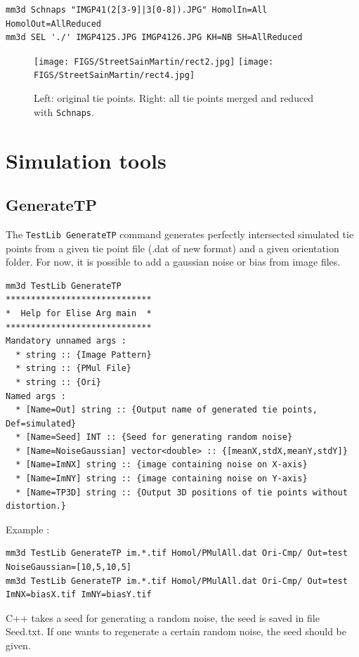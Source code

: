 \begin{verbatim}
mm3d Schnaps "IMGP41(2[3-9]|3[0-8]).JPG" HomolIn=All HomolOut=AllReduced
mm3d SEL './' IMGP4125.JPG IMGP4126.JPG KH=NB SH=AllReduced
\end{verbatim} 

\begin{figure}[!h]
	\begin{center}
		\texttt{[image: FIGS/StreetSainMartin/rect2.jpg]}
		\texttt{[image: FIGS/StreetSainMartin/rect4.jpg]}
		\caption{Left: original tie points. Right: all tie points merged and reduced with \texttt{Schnaps}.}
	\end{center}	
\end{figure}

\section{Simulation tools}
\subsection{GenerateTP}
The {\tt TestLib GenerateTP} command generates perfectly intersected simulated tie points from a given tie point file (.dat of new format) and a given orientation folder. For now, it is possible to add a gaussian noise or bias from image files.

\begin{verbatim}
mm3d TestLib GenerateTP
*****************************
*  Help for Elise Arg main  *
*****************************
Mandatory unnamed args : 
  * string :: {Image Pattern}
  * string :: {PMul File}
  * string :: {Ori}
Named args : 
  * [Name=Out] string :: {Output name of generated tie points, Def=simulated}
  * [Name=Seed] INT :: {Seed for generating random noise}
  * [Name=NoiseGaussian] vector<double> :: {[meanX,stdX,meanY,stdY]}
  * [Name=ImNX] string :: {image containing noise on X-axis}
  * [Name=ImNY] string :: {image containing noise on Y-axis}
  * [Name=TP3D] string :: {Output 3D positions of tie points without distortion.}

\end{verbatim}

Example :
\begin{verbatim}
mm3d TestLib GenerateTP im.*.tif Homol/PMulAll.dat Ori-Cmp/ Out=test NoiseGaussian=[10,5,10,5]
mm3d TestLib GenerateTP im.*.tif Homol/PMulAll.dat Ori-Cmp/ Out=test ImNX=biasX.tif ImNY=biasY.tif
\end{verbatim}
C++ takes a seed for generating a random noise, the seed is saved in file Seed.txt. If one wants to regenerate a certain random noise, the seed should be given.


